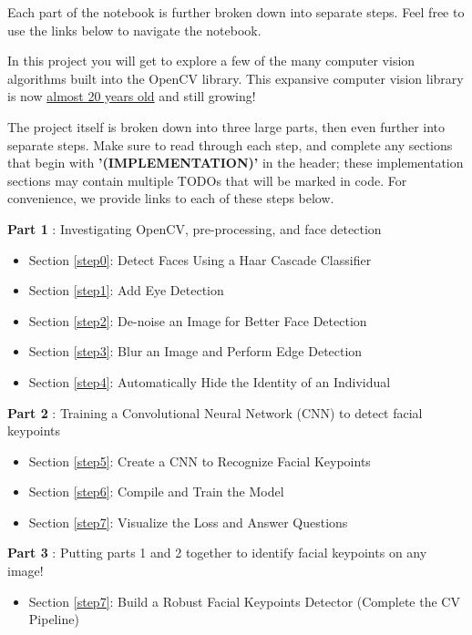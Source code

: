 \documentclass[11pt]{article}
\providecommand{\tightlist}{%
      \setlength{\itemsep}{0pt}\setlength{\parskip}{0pt}}
\begin{document}
Each part of the notebook is further broken down into separate steps.
Feel free to use the links below to navigate the notebook.

In this project you will get to explore a few of the many computer
vision algorithms built into the OpenCV library. This expansive computer
vision library is now
\href{https://en.wikipedia.org/wiki/OpenCV\#History}{almost 20 years
old} and still growing!

The project itself is broken down into three large parts, then even
further into separate steps. Make sure to read through each step, and
complete any sections that begin with \textbf{'(IMPLEMENTATION)'} in the
header; these implementation sections may contain multiple TODOs that
will be marked in code. For convenience, we provide links to each of
these steps below.

\textbf{Part 1} : Investigating OpenCV, pre-processing, and face
detection

\begin{itemize}
\tightlist
\item
  Section \ref{step0}: Detect Faces Using a Haar Cascade Classifier
\item
  Section \ref{step1}: Add Eye Detection
\item
  Section \ref{step2}: De-noise an Image for Better Face Detection
\item
  Section \ref{step3}: Blur an Image and Perform Edge Detection
\item
  Section \ref{step4}: Automatically Hide the Identity of an Individual
\end{itemize}

\textbf{Part 2} : Training a Convolutional Neural Network (CNN) to
detect facial keypoints

\begin{itemize}
\tightlist
\item
  Section \ref{step5}: Create a CNN to Recognize Facial Keypoints
\item
  Section \ref{step6}: Compile and Train the Model
\item
  Section \ref{step7}: Visualize the Loss and Answer Questions
\end{itemize}

\textbf{Part 3} : Putting parts 1 and 2 together to identify facial
keypoints on any image!

\begin{itemize}
\tightlist
\item
  Section \ref{step7}: Build a Robust Facial Keypoints Detector
  (Complete the CV Pipeline)
\end{itemize}
\end{document}
